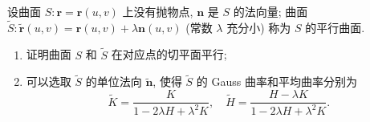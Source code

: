 \documentclass[../../main.tex]{subfiles}
\begin{document}
\hspace*{\fill} 
\begin{example}
    设曲面 $S: \mathbf{r} = \mathbf{r}(u,v)$ 上没有抛物点, $\mathbf{n}$ 是 $S$ 的法向量; 曲面 $\tilde{S}: \tilde{\mathbf{r}}(u,v) = \mathbf{r}(u,v) + \lambda \mathbf{n}(u,v)$ (常数 $\lambda$ 充分小) 称为 $S$ 的平行曲面.
\begin{enumerate}
    \item 证明曲面 $S$ 和 $\tilde{S}$ 在对应点的切平面平行;
    \item 可以选取 $\tilde{S}$ 的单位法向 $\tilde{\mathbf{n}}$, 使得 $\tilde{S}$ 的 Gauss 曲率和平均曲率分别为
    $$ \tilde{K} = \frac{K}{1 - 2\lambda H + \lambda^2 K}, \quad \tilde{H} = \frac{H - \lambda K}{1 - 2\lambda H + \lambda^2 K}. $$
\end{enumerate}
\end{example}
\end{document}
